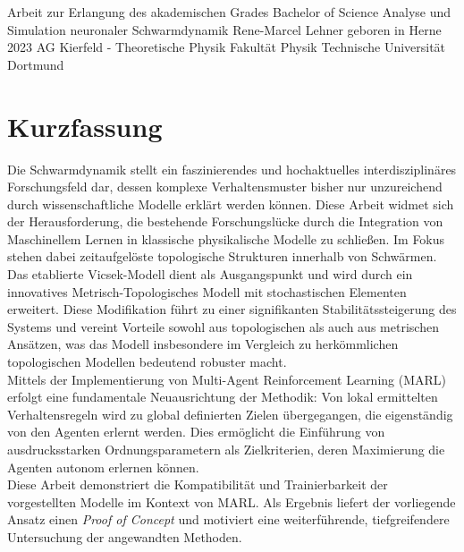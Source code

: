 \documentclass{solutionclass}
\begin{document}

\pretitle
{Arbeit zur Erlangung des akademischen Grades}
{Bachelor of Science}
{Analyse und Simulation neuronaler Schwarmdynamik}
{Rene-Marcel Lehner}
{geboren in Herne}
{2023}
{AG Kierfeld - Theoretische Physik}
{Fakultät Physik}
{Technische Universität Dortmund}

\newpage

\makecorrectorpage

\newpage
\section*{Kurzfassung}

Die Schwarmdynamik stellt ein faszinierendes und hochaktuelles interdisziplinäres Forschungsfeld dar, dessen komplexe Verhaltensmuster bisher nur unzureichend durch wissenschaftliche Modelle erklärt werden können. Diese Arbeit widmet sich der Herausforderung, die bestehende Forschungslücke durch die Integration von Maschinellem Lernen in klassische physikalische Modelle zu schließen. Im Fokus stehen dabei zeitaufgelöste topologische Strukturen innerhalb von Schwärmen.\\

Das etablierte Vicsek-Modell dient als Ausgangspunkt und wird durch ein innovatives Metrisch-Topologisches Modell mit stochastischen Elementen erweitert. Diese Modifikation führt zu einer signifikanten Stabilitätssteigerung des Systems und vereint Vorteile sowohl aus topologischen als auch aus metrischen Ansätzen, was das Modell insbesondere im Vergleich zu herkömmlichen topologischen Modellen bedeutend robuster macht.\\

Mittels der Implementierung von Multi-Agent Reinforcement Learning (MARL) erfolgt eine fundamentale Neuausrichtung der Methodik: Von lokal ermittelten Verhaltensregeln wird zu global definierten Zielen übergegangen, die eigenständig von den Agenten erlernt werden. Dies ermöglicht die Einführung von ausdrucksstarken Ordnungsparametern als Zielkriterien, deren Maximierung die Agenten autonom erlernen können.\\

Diese Arbeit demonstriert die Kompatibilität und Trainierbarkeit der vorgestellten Modelle im Kontext von MARL. Als Ergebnis liefert der vorliegende Ansatz einen \textit{Proof of Concept} und motiviert eine weiterführende, tiefgreifendere Untersuchung der angewandten Methoden.
\;\\
\;\\
\;\\
\;\\
\;\\
\;\\
\;\\
\end{document}
